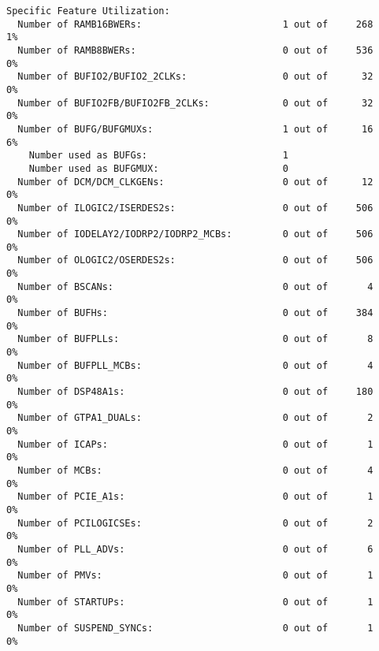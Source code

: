 \begin{verbatim}
Specific Feature Utilization:
  Number of RAMB16BWERs:                         1 out of     268    1%
  Number of RAMB8BWERs:                          0 out of     536    0%
  Number of BUFIO2/BUFIO2_2CLKs:                 0 out of      32    0%
  Number of BUFIO2FB/BUFIO2FB_2CLKs:             0 out of      32    0%
  Number of BUFG/BUFGMUXs:                       1 out of      16    6%
    Number used as BUFGs:                        1
    Number used as BUFGMUX:                      0
  Number of DCM/DCM_CLKGENs:                     0 out of      12    0%
  Number of ILOGIC2/ISERDES2s:                   0 out of     506    0%
  Number of IODELAY2/IODRP2/IODRP2_MCBs:         0 out of     506    0%
  Number of OLOGIC2/OSERDES2s:                   0 out of     506    0%
  Number of BSCANs:                              0 out of       4    0%
  Number of BUFHs:                               0 out of     384    0%
  Number of BUFPLLs:                             0 out of       8    0%
  Number of BUFPLL_MCBs:                         0 out of       4    0%
  Number of DSP48A1s:                            0 out of     180    0%
  Number of GTPA1_DUALs:                         0 out of       2    0%
  Number of ICAPs:                               0 out of       1    0%
  Number of MCBs:                                0 out of       4    0%
  Number of PCIE_A1s:                            0 out of       1    0%
  Number of PCILOGICSEs:                         0 out of       2    0%
  Number of PLL_ADVs:                            0 out of       6    0%
  Number of PMVs:                                0 out of       1    0%
  Number of STARTUPs:                            0 out of       1    0%
  Number of SUSPEND_SYNCs:                       0 out of       1    0%
\end{verbatim}
